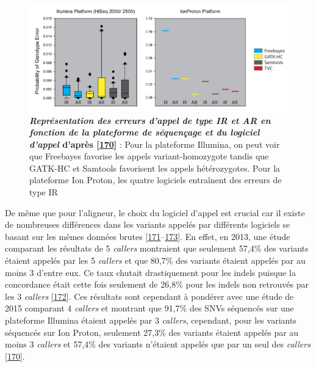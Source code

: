 \documentclass[12pt,a4paper,twoside]{ugathesis}
\theoremstyle{definition}
\theoremstyle{definition}
\theoremstyle{definition}
\theoremstyle{remark}
\begin{document}
\begin{figure}

{\centering \includegraphics[scale=.5]{figure/snp_error_type} 

}

\caption[Représentation des erreurs d'appel de type IR et AR en fonction de la plateforme de séquençage et du logiciel d'appel]{\textbf{\emph{Représentation des erreurs d'appel de
type IR et AR en fonction de la plateforme de séquençage et du logiciel
d'appel} d'après {[}\protect\hyperlink{ref-Hwang2015}{170}{]}} : Pour la
plateforme Illumina, on peut voir que Freebayes favorise les appels
variant-homozygote tandis que GATK-HC et Samtools favorisent les appels
hétérozygotes. Pour la plateforme Ion Proton, les quatre logiciels
entraînent des erreurs de type IR}\label{fig:pictsnperror}
\end{figure}









De même que pour l'aligneur, le choix du logiciel d'appel est crucial
car il existe de nombreuses différences dans les variants appelés par
différents logiciels se basant sur les mêmes données brutes
{[}\protect\hyperlink{ref-Baes2014}{171}--\protect\hyperlink{ref-Rosenfeld2012}{173}{]}.
En effet, en 2013, une étude comparant les résultats de 5 \emph{callers}
montraient que seulement 57,4\% des variants étaient appelés par les 5
\emph{callers} et que 80,7\% des variants étaient appelés par au moins 3
d'entre eux. Ce taux chutait drastiquement pour les indels puisque la
concordance était cette fois seulement de 26,8\% pour les indels non
retrouvés par les 3 \emph{callers}
{[}\protect\hyperlink{ref-ORawe2013}{172}{]}. Ces résultats sont
cependant à pondérer avec une étude de 2015 comparant 4 \emph{callers}
et montrant que 91,7\% des SNVs séquencés sur une plateforme Illumina
étaient appelés par 3 \emph{callers}, cependant, pour les variants
séquencés sur Ion Proton, seulement 27,3\% des variants étaient appelés
par au moins 3 \emph{callers} et 57,4\% des variants n'étaient appelés
que par un seul des \emph{callers}
{[}\protect\hyperlink{ref-Hwang2015}{170}{]}.
\end{document}
